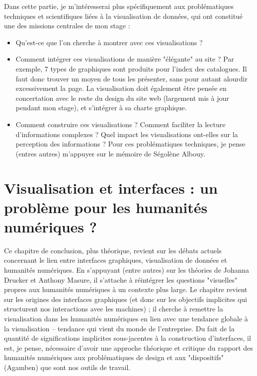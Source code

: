 \documentclass[a4paper, 12pt, twoside]{book}
\begin{document}
Dans cette partie, je m'intéresserai plus spécifiquement aux problématiques techniques et scientifiques liées à la visualisation de données, qui ont constitué une des missions centrales de mon stage :
\begin{itemize}
	\item{Qu'est-ce que l'on cherche à montrer avec ces visualisations ?}
	\item{Comment intégrer ces visualisations de manière "élégante" au site ? Par exemple, 7 types de graphiques sont produits pour l'index des catalogues. Il faut donc trouver un moyen de tous les présenter, sans pour autant alourdir excessivement la page. La visualisation doit également être pensée en concertation avec le reste du design du site web (largement mis à jour pendant mon stage), et s'intégrer à sa charte graphique.}
	\item{Comment construire ces visualisations ? Comment faciliter la lecture d'informations complexes ? Quel impact les visualisations ont-elles sur la perception des informations ? Pour ces problématiques techniques, je pense (entres autres) m'appuyer sur le mémoire de Ségolène Albouy.}
\end{itemize}

\chapter{Visualisation et interfaces : un problème pour les humanités numériques ?}
Ce chapitre de conclusion, plus théorique, revient sur les débats actuels concernant le lien entre interfaces graphiques, visualisation de données et humanités numériques. En s'appuyant (entre autres) sur les théories de Johanna Drucker et Anthony Masure, il s'attache à réintégrer les questions "visuelles" propres aux humanités numériques à un contexte plus large. Le chapitre revient sur les origines des interfaces graphiques (et donc sur les objectifs implicites qui structurent nos interactions avec les machines) ; il cherche à remettre la visualisation dans les humanités numériques en lien avec une tendance globale à la visualisation -- tendance qui vient du monde de l'entreprise. Du fait de la quantité de significations implicites sous-jacentes à la construction d'interfaces, il est, je pense, nécessaire d'avoir une approche théorique et critique du rapport des humanités numériques aux problématiques de design et aux "dispositifs" (Agamben) que sont nos outils de travail.

\listoffigures
\listoftables
\tableofcontents
\end{document}
